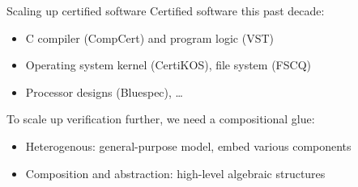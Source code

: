 \documentclass[aspectratio=141]{beamer}
\begin{document}
\begin{frame}{Scaling up certified software} %
  Certified software this past decade:
  \begin{itemize}
    \item C compiler (CompCert) and program logic (VST)
    \item Operating system kernel (CertiKOS), file system (FSCQ)
    \item Processor designs (Bluespec), \ldots
  \end{itemize}

  \pause
  To scale up verification further, we need a compositional glue:
  \begin{itemize}
    \item Heterogenous: general-purpose model, embed various components
    \item Composition and abstraction: high-level algebraic structures
  \end{itemize}
\end{frame}
\end{document}
